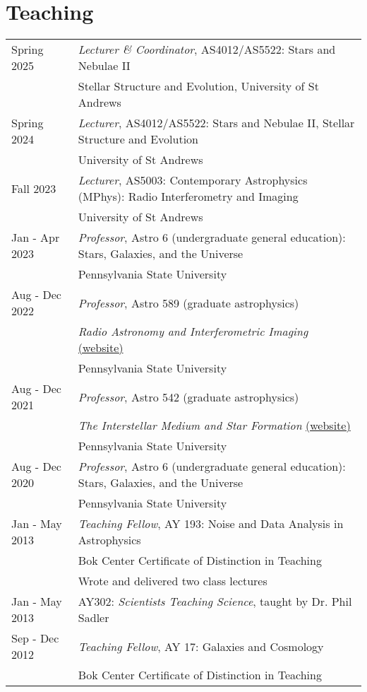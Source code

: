 \section*{Teaching}
\begin{tabular*}{\textwidth}{@{\hspace{10pt}}p{1.4in}l}
Spring 2025 & \emph{Lecturer \& Coordinator}, AS4012/AS5522: Stars and Nebulae II\\
& Stellar Structure and Evolution, University of St Andrews \\
Spring 2024 & \emph{Lecturer}, AS4012/AS5522: Stars and Nebulae II, Stellar Structure and Evolution \\
& University of St Andrews \\
Fall 2023 & \emph{Lecturer}, AS5003: Contemporary Astrophysics (MPhys): Radio Interferometry and Imaging \\
& University of St Andrews \\
Jan - Apr 2023 & \emph{Professor}, Astro 6 (undergraduate general education): Stars, Galaxies, and the Universe\\
& Pennsylvania State University \\    
Aug - Dec 2022 & \emph{Professor}, Astro 589 (graduate astrophysics)\\
& \emph{Radio Astronomy and Interferometric Imaging} \href{https://iancze.github.io/courses/astro589/}{(website)}\\    
& Pennsylvania State University \\ 
Aug - Dec 2021 & \emph{Professor}, Astro 542 (graduate astrophysics)\\
& \emph{The Interstellar Medium and Star Formation} \href{https://iancze.github.io/courses/astro542/}{(website)}\\    
& Pennsylvania State University \\ 
Aug - Dec 2020 & \emph{Professor}, Astro 6 (undergraduate general education): Stars, Galaxies, and the Universe\\
& Pennsylvania State University \\ 
Jan - May 2013 & \emph{Teaching Fellow}, AY 193: Noise and Data Analysis in Astrophysics\\
& Bok Center Certificate of Distinction in Teaching\\
& Wrote and delivered two class lectures\\
Jan - May 2013 & AY302: \emph{Scientists Teaching Science}, taught by Dr. Phil Sadler\\
Sep - Dec 2012 & \emph{Teaching Fellow}, AY 17: Galaxies and Cosmology\\
& Bok Center Certificate of Distinction in Teaching\\
\end{tabular*}
